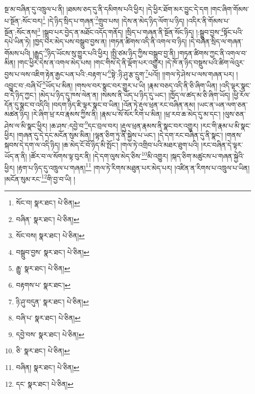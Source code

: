 སྔ་མ་བཞིན་དུ་འཁྲུལ་པ་ནི། །ཐམས་ཅད་དུ་ནི་དམིགས་པའི་ཕྱིར། །དེ་ཕྱིར་ཐོག་མར་བྱུང་དེ་དག །གང་ཞིག་གོམས་པ་སྔོན་:སོང་བར།\footnote{སོང་བ།  སྣར་ཐང་།  པེ་ཅིན། } །དེ་ཉིད་སྲིད་པ་གཞན་\footnote{བཞིན་  སྣར་ཐང་།  པེ་ཅིན། }གྲུབ་པས། །དེས་ན་མེད་ཉིད་ལོག་པ་ཉིད། །འདིར་ནི་གོམས་པ་སྔོན་:སོང་ནས།\footnote{སོང་བས།  སྣར་ཐང་།  པེ་ཅིན། } །སྒྲུབ་པར་བྱེད་ན་མཐོང་འདོད་གནོད། །སྲིད་པ་གཞན་ནི་སྔོན་སོང་ཉིད། །:སྒྲུབ་བྱས་\footnote{བསྒྲུབ་བྱས་  སྣར་ཐང་།  པེ་ཅིན། }སྟོང་པའི་དཔེ་ཡིན་ཏེ། །ཁྱད་པར་མེད་པས་བསྒྲུབ་བྱས་ན། །གཏན་ཚིགས་འདི་ནི་འགལ་བ་ཉིད། །དེ་བཞིན་སྲིད་ལ་གཞན་གོམས་པའི། །རྒྱུད་\footnote{རྒྱུ་  སྣར་ཐང་།  པེ་ཅིན། }ཉིད་ཡོངས་སུ་གྱུར་པའི་ཕྱིར། །སྤྱི་ཙམ་ཉིད་ཀྱིས་བསྒྲུབ་བྱ་ནི། །གཏན་ཚིགས་ཀྱང་ནི་འགལ་བ་མིན། །གང་ཕྱིར་དེས་ན་འགལ་མེད་པས། །གང་གིས་དེ་ནི་ལྡོག་པར་འགྱུར། །དེ་ཁོ་ན་ཉིད་བསྡུས་པའི་ཚིག་ལེའུར་བྱས་པ་ལས་འཇིག་རྟེན་རྒྱང་པན་པའི་:བརྟག་པ་\footnote{བརྟགས་པ་  སྣར་ཐང་། }སྟེ་:ཉི་ཤུ་རྩ་དྲུག་\footnote{ཉི་ཤུ་བདུན་  སྣར་ཐང་།  པེ་ཅིན། }པའོ།། །།གལ་ཏེ་ཤེས་པ་ལས་གཞན་པར། །འབྱུང་བ་:བཞི་པོ་\footnote{བཞི་པ་  སྣར་ཐང་།  པེ་ཅིན། }ཡོད་པ་མིན། །གསལ་བར་སྣང་བར་གྱུར་པ་ཡི། །རྣམ་བཅད་འདི་ནི་ཅི་ཞིག་ཡིན། །འདི་ལྟར་སྣང་བ་དེ་ཉིད་ཀྱང་། །མེད་པ་ཉིད་དུ་ཁས་ལེན་ན། །སེམས་ནི་ཡོད་པ་ཉིད་དུ་ཡང་། །ཁྱོད་ལ་ཚད་མ་ཅི་ཞིག་ཡོད། །ཕྱི་རོལ་དོན་དུ་སྣང་བ་འདིའི། །བདག་ཉིད་ཇི་ལྟར་སྣང་བ་ཡིན། །འོན་ཏེ་རྡུལ་ཕྲན་རང་བཞིན་ནམ། །ཡང་ན་ཡན་ལག་ཅན་མཚན་ཉིད། །རེ་ཞིག་ཕྲ་རབ་རྣམས་ཀྱིས་ནི། །རྣམ་པ་སོ་སོར་རིག་པ་མིན། །ཕྲ་རབ་ཆ་མེད་དུ་མ་དང་། །ལུས་ཅན་ཤེས་ལ་མི་སྣང་ཕྱིར། །ཆ་ཤས་:དབྱེ་བ་\footnote{དབྱེ་བས་  སྣར་ཐང་།  པེ་ཅིན། }དང་བྲལ་བར། །རྡུལ་ཕྲན་རྣམས་ནི་སྣང་བར་འགྱུར། །རང་གི་རྣམ་པ་མི་སྣང་ཕྱིར། །གཞན་དུ་དེ་དང་མངོན་སུམ་མིན། །ལྷན་ཅིག་ཏུ་ནི་སྐྱེས་པ་ཡང་། །དེ་དག་རང་བཞིན་དུ་ནི་སྣང་། །གནས་སྐབས་དེ་དག་ལ་འདི་ཉིད། །ཆ་མེད་ངོ་བོ་ཉིད་མི་སྤོང་། །གལ་ཏེ་འགྲིབ་པའི་མཐར་ཐུག་པའི། །རང་བཞིན་དེ་ལྟར་ཡོད་ན་ནི། །ཚོར་བ་ལ་སོགས་ལྟ་བུར་ནི། །དེ་དག་ལུས་མེད་ཅིས་\footnote{ཅི་  སྣར་ཐང་།  པེ་ཅིན། }མི་འགྱུར། །སྐད་ཅིག་མཚུངས་པ་གཞན་སྐྱེའི་ཕྱིར། །རྟག་པ་ཉིད་དུ་འཁྲུལ་པ་གཞན།\footnote{བཞིན།  སྣར་ཐང་།  པེ་ཅིན། } །གལ་ཏེ་རིགས་མཐུན་པར་མེད་པར། །འཛིན་ན་རིགས་པ་འཁྲུལ་པ་ཡིན། །མངོན་སུམ་རང་\footnote{དང་  སྣར་ཐང་།  པེ་ཅིན། }གི་བྱ་བ་ཡི། །
